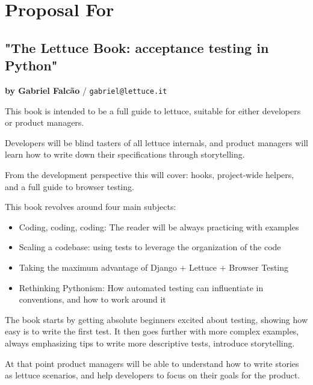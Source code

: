 \documentclass[letterpaper]{article}
\begin{document}
\section*{Proposal For}

\subsection*{"The Lettuce Book: acceptance testing in Python"}
\normalsize\textbf{by Gabriel Falcão} \large{/} \texttt{gabriel@lettuce.it}

\normalsize

This book is intended to be a full guide to lettuce, suitable for
either developers or product managers.

\noindent
Developers will be blind tasters of all lettuce internals, and product
managers will learn how to write down their specifications through
storytelling.

\noindent
From the development perspective this will cover: hooks, project-wide
helpers, and a full guide to browser testing.

\noindent
This book revolves around four main subjects:

\begin{itemize}

\item{Coding, coding, coding: The reader will be always practicing with examples}

\item{Scaling a codebase: using tests to leverage the organization of the code}

\item{Taking the maximum advantage of Django + Lettuce + Browser Testing}

\item{Rethinking Pythonism: How automated testing can influentiate in conventions, and how to work around it}
\end{itemize}

\noindent

The book starts by getting absolute beginners excited about testing, showing how easy is to write the first test.
It then goes further with more complex examples, always emphasizing
tips to write more descriptive tests, introduce storytelling.

\noindent
At that point product managers will be able to understand how to write
stories as lettuce scenarios, and help developers to focus on their
goals for the product.
\end{document}
